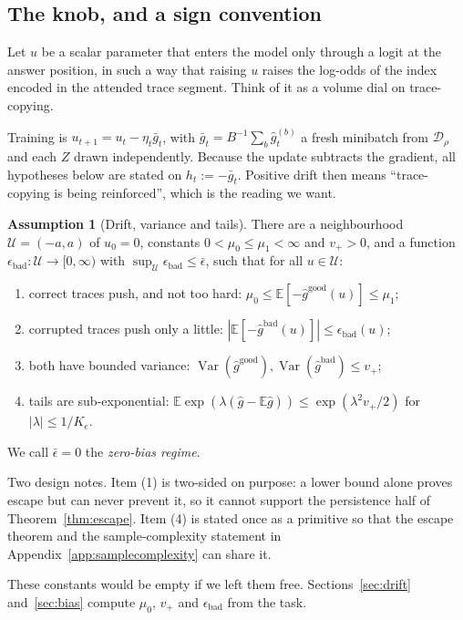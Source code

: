 \documentclass{article}
\theoremstyle{plain}
\theoremstyle{definition}
\newtheorem{assumption}{Assumption}
\theoremstyle{remark}
\newcommand{\E}{\mathbb{E}}
\newcommand{\Var}{\operatorname{Var}}
\newcommand{\1}{\mathbf{1}}
\newcommand{\cD}{\mathcal{D}}
\newcommand{\cU}{\mathcal{U}}
\newcommand{\good}{\mathrm{good}}
\newcommand{\bad}{\mathrm{bad}}
\begin{document}
\subsection{The knob, and a sign convention}

Let $u$ be a scalar parameter that enters the model only through a logit at the
answer position, in such a way that raising $u$ raises the log-odds of the index
encoded in the attended trace segment. Think of it as a volume dial on
trace-copying.

Training is $u_{t+1} = u_t - \eta_t\bar g_t$, with
$\bar g_t = B^{-1}\sum_b \hat g_t^{(b)}$ a fresh minibatch from $\cD_\rho$ and
each $Z$ drawn independently. Because the update subtracts the gradient, all
hypotheses below are stated on $h_t := -\bar g_t$. Positive drift then means
``trace-copying is being reinforced'', which is the reading we want.

\begin{assumption}[Drift, variance and tails]
\label{ass:main}
There are a neighbourhood $\cU = (-a,a)$ of $u_0 = 0$, constants
$0<\mu_0\le\mu_1<\infty$ and $v_+ > 0$, and a function
$\epsilon_\bad:\cU\to[0,\infty)$ with $\sup_\cU\epsilon_\bad\le\bar\epsilon$,
such that for all $u\in\cU$:
\begin{enumerate}[leftmargin=*,itemsep=1pt,label=(\arabic*)]
\item correct traces push, and not too hard: $\mu_0\le\E[-\hat g^{\good}(u)]\le\mu_1$;
\item corrupted traces push only a little: $|\E[-\hat g^{\bad}(u)]|\le\epsilon_\bad(u)$;
\item both have bounded variance: $\Var(\hat g^{\good}),\Var(\hat g^{\bad})\le v_+$;
\item tails are sub-exponential:
$\E\exp(\lambda(\hat g-\E\hat g))\le\exp(\lambda^2v_+/2)$ for $|\lambda|\le1/K_e$.
\end{enumerate}
We call $\bar\epsilon = 0$ the \emph{zero-bias regime}.
\end{assumption}

Two design notes. Item (1) is two-sided on purpose: a lower bound alone proves
escape but can never prevent it, so it cannot support the persistence half of
Theorem~\ref{thm:escape}. Item (4) is stated once as a primitive so that the
escape theorem and the sample-complexity statement in
Appendix~\ref{app:samplecomplexity} can share it.

These constants would be empty if we left them free. Sections~\ref{sec:drift}
and~\ref{sec:bias} compute $\mu_0$, $v_+$ and $\epsilon_\bad$ from the task.
\end{document}
